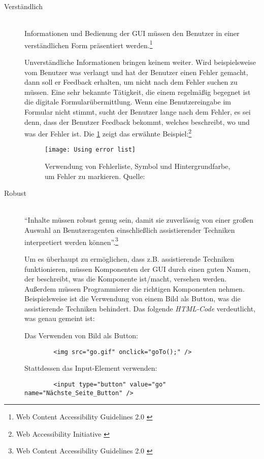 \begin{description}
	
	\item [Verständlich]\hfill \\
	Informationen und Bedienung der \ac{GUI} müssen den Benutzer in einer verständlichen Form präsentiert 
	werden.\footnote{Web Content Accessibility Guidelines 2.0 \cite{WCAG2.0}}
	
	Unverständliche Informationen bringen keinem weiter. Wird beispielsweise vom Benutzer was verlangt und hat der Benutzer einen Fehler gemacht, dann soll er Feedback erhalten,
	um nicht nach dem Fehler suchen zu müssen. Eine sehr bekannte Tätigkeit, die einem regelmäßig begegnet ist die digitale Formularübermittlung. Wenn eine 
	Benutzereingabe im Formular nicht stimmt, sucht der Benutzer lange nach dem Fehler, es sei denn, dass der Benutzer Feedback bekommt, welches beschreibt, wo und was der Fehler 
	ist. Die \cref{fig:Using error list} zeigt das erwähnte Beispiel:\footnote{Web Accessibility Initiative \cite{WAI}}
	
	\begin{figure}[H]
		\centering
		\texttt{[image: Using error list]}
		\caption[Verwendung von Fehlerliste, Symbol und Hintergrundfarbe, um Fehler zu markieren]{Verwendung von Fehlerliste, Symbol
		 und Hintergrundfarbe, um Fehler zu markieren. Quelle: \cite{WAI}}
		\label{fig:Using error list}
	\end{figure}
	
	\item [Robust]\hfill \\
	"`Inhalte müssen robust genug sein, damit sie zuverlässig von einer großen Auswahl an Benutzeragenten einschließlich assistierender Techniken 
	interpretiert werden können"'.\footnote{Web Content Accessibility Guidelines 2.0 \cite{WCAG2.0}}
	
	Um es überhaupt zu ermöglichen, dass z.B. assistierende Techniken funktionieren, müssen Komponenten der \ac{GUI} durch einen guten Namen, der beschreibt, was die Komponente
	ist/macht, versehen werden. Außerdem müssen Programmierer die richtigen Komponenten nehmen. Beispielsweise ist die Verwendung von 
	einem Bild als Button, was die assistierende Techniken behindert. Das folgende \textit{HTML-Code} verdeutlicht, was genau gemeint ist:
	
	Das Verwenden von Bild als Button:
	
	{\color{blue}
	\begin{verbatim}
		<img src="go.gif" onclick="goTo();" />
	\end{verbatim}}
	
	Stattdessen das Input-Element verwenden:
	
	{\color{blue}
	\begin{verbatim}
		<input type="button" value="go" name="Nächste_Seite_Button" />
	\end{verbatim}}
	
\end{description}

